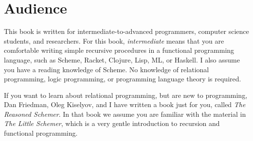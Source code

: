 




\section{Audience}\label{sec:preface:audience}

This book is written for
intermediate-to-advanced programmers, computer science students, and
researchers.  For this book, \emph{intermediate} means that you are
comfortable writing simple recursive procedures in a functional
programming language, such as Scheme, Racket, Clojure, Lisp, ML, or
Haskell.  I also assume you have a reading knowledge of Scheme.
%
No knowledge of relational programming, logic programming, or programming
language theory is required.

If you want to learn about relational programming, but are new to
programming, Dan Friedman, Oleg Kiselyov, and I have written a book just for you, called
\emph{The Reasoned Schemer}\cite{trs}. In that book we assume you are familiar with the material in \emph{The Little
  Schemer}\cite{Friedman:1996:LS:230223}, which is a very gentle introduction to recursion and
functional programming.

